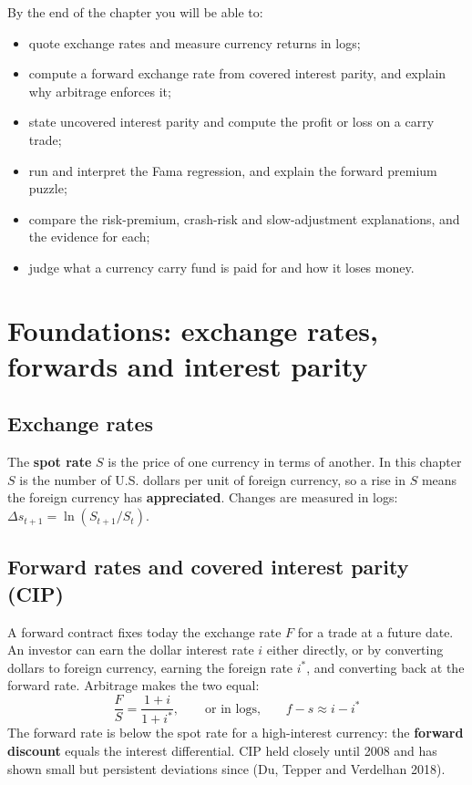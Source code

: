 By the end of the chapter you will be able to:

\begin{itemize}
  \item quote exchange rates and measure currency returns in logs;
  \item compute a forward exchange rate from covered interest parity, and explain why arbitrage enforces it;
  \item state uncovered interest parity and compute the profit or loss on a carry trade;
  \item run and interpret the Fama regression, and explain the forward premium puzzle;
  \item compare the risk-premium, crash-risk and slow-adjustment explanations, and the evidence for each;
  \item judge what a currency carry fund is paid for and how it loses money.
\end{itemize}

\section{Foundations: exchange rates, forwards and interest parity}
\label{sec:11-foundations}

\subsection{Exchange rates}

The \textbf{spot rate} $S$ is the price of one currency in terms of another. In this chapter $S$ is the number of U.S. dollars per unit of foreign currency, so a rise in $S$ means the foreign currency has \textbf{appreciated}. Changes are measured in logs: $\Delta s_{t+1} = \ln(S_{t+1}/S_t)$.

\subsection{Forward rates and covered interest parity (CIP)}

A forward contract fixes today the exchange rate $F$ for a trade at a future date. An investor can earn the dollar interest rate $i$ either directly, or by converting dollars to foreign currency, earning the foreign rate $i^*$, and converting back at the forward rate. Arbitrage makes the two equal:
\begin{equation}
  \frac{F}{S} = \frac{1 + i}{1 + i^*}, \qquad \text{or in logs,} \qquad f - s \approx i - i^*
  \label{eq:11-cip}
\end{equation}
The forward rate is below the spot rate for a high-interest currency: the \textbf{forward discount} equals the interest differential. CIP held closely until 2008 and has shown small but persistent deviations since (Du, Tepper and Verdelhan 2018).


